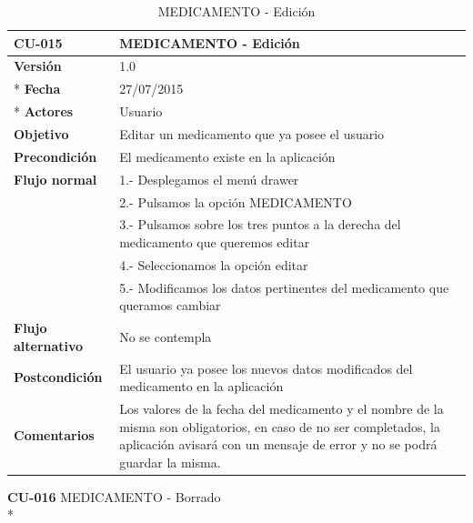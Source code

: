 \documentclass[../pfc.tex]{subfiles}
\begin{document}
		\begin{table}[H]
			\centering
			\begin{tabular}[t]{|p{3cm}|p{9.5cm}|}
				\hline \textbf{CU-015} & \textbf{MEDICAMENTO - Edición} \\*
				\hline\hline \textbf{Versión} & 1.0 \\ *
				\hline\hline \textbf{Fecha} & 27/07/2015 \\ *
				\hline\textbf{Actores} 	& Usuario\\*
				\hline \textbf{Objetivo} & Editar un medicamento que ya posee el usuario\\* 			
				\hline \textbf{Precondición} & El medicamento existe en la aplicación\\* 
				\hline \textbf{Flujo normal} & 1.- Desplegamos el menú drawer \\* 
				& 2.- Pulsamos la opción MEDICAMENTO\\*	
				& 3.- Pulsamos sobre los tres puntos a la derecha del medicamento que queremos editar\\*	
				& 4.- Seleccionamos la opción editar\\*	
				& 5.- Modificamos los datos pertinentes del medicamento que queramos cambiar\\*	
				\hline \textbf{Flujo alternativo} & No se contempla \\* 
				\hline \textbf{Postcondición} & El usuario ya posee los nuevos datos modificados del medicamento en la aplicación \\* 
				\hline \textbf{Comentarios}   & Los valores de la fecha del medicamento y el nombre de la misma son obligatorios, en caso de no ser completados, la aplicación avisará con un mensaje de error y no se podrá guardar la misma.\\*
				\hline
			\end{tabular}
			\caption{MEDICAMENTO - Edición}
			\label{tabla:caso015}
		\end{table}
		
		\textbf{CU-016}	MEDICAMENTO - Borrado\\*
		
\end{document}

